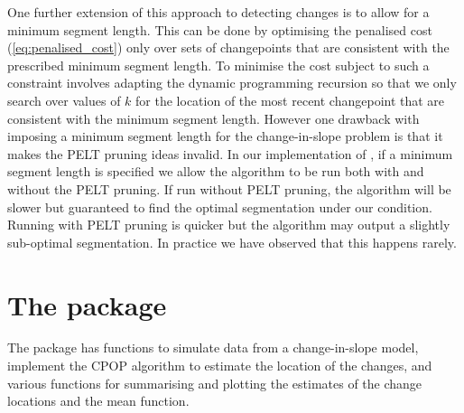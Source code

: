\documentclass[article]{jss}
\begin{document}
One further extension of this approach to detecting changes is to allow for a minimum segment length. This can be done by optimising the penalised cost (\ref{eq:penalised_cost}) only over sets of changepoints that are consistent with the prescribed minimum segment length. To minimise the cost subject to such a constraint involves adapting the dynamic programming recursion so that we only search over values of $k$ for the location of the most recent changepoint that are consistent with the minimum segment length. However one drawback with imposing a minimum segment length for the change-in-slope problem is that it makes the PELT pruning ideas invalid. In our implementation of , if a minimum segment length is specified we allow the algorithm to be run both with and without the PELT pruning. If run without PELT pruning, the algorithm will be slower but guaranteed to find the optimal segmentation under our condition. Running with PELT pruning is quicker but the algorithm may output a slightly sub-optimal segmentation. In practice we have observed that this happens rarely. %


\section[The cpop package]{The  package} \label{sec:cpop}

The  package has functions to simulate data from a change-in-slope model, implement the CPOP algorithm to estimate the location of the changes, and various functions for summarising and plotting the estimates of the change locations and the mean function. 
\end{document}
